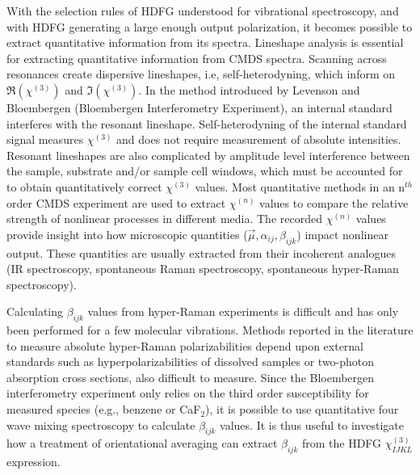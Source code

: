 \documentclass[aip, jcp, reprint, onecolumn]{revtex4-2}
\begin{document}
With the selection rules of HDFG understood for vibrational spectroscopy, and with HDFG generating a large enough output polarization, it becomes possible to extract quantitative information from its spectra.
Lineshape analysis is essential for extracting quantitative information from CMDS spectra.
Scanning across resonances create dispersive lineshapes, i.e, self-heterodyning, which inform on $\Re(\chi^{(3)})$ and $\Im(\chi^{(3)})$.\cite{Levenson1974_1, Levenson1974_2}
In the method introduced by Levenson and Bloembergen (Bloembergen Interferometry Experiment), an internal standard interferes with the resonant lineshape.
Self-heterodyning of the internal standard signal measures $\chi^{(3)}$ and does not require measurement of absolute intensities. 
Resonant lineshapes are also complicated by amplitude level interference between the sample,  substrate and/or sample cell windows, which must be accounted for to obtain quantitatively correct $\chi^{(3)}$ values. \cite{RN362, RN418}
Most quantitative methods in an n$^{th}$ order CMDS experiment are used to extract $\chi^{(n)}$ values to compare the relative strength of nonlinear processes in different media. \cite{Zhu87, RN351, RN345}
The recorded $\chi^{(n)}$ values provide insight into how microscopic quantities ($\vec{\mu}, \alpha_{ij}, \beta_{ijk}$) impact nonlinear output.
These quantities are usually extracted from their incoherent analogues (IR spectroscopy, spontaneous Raman spectroscopy, spontaneous hyper-Raman spectroscopy). \cite{Levenson1974_2, RN412, Shoute2005}

Calculating $\beta_{ijk}$ values from hyper-Raman experiments is difficult and has only been performed for a few molecular vibrations. \cite{Xu1997, Shoute2005, Kelley2010}
Methods reported in the literature to measure absolute hyper-Raman polarizabilities depend upon external standards such as hyperpolarizabilities of dissolved samples or two-photon absorption cross sections, also difficult to measure.
Since the Bloembergen interferometry experiment only relies on the third order susceptibility for measured species (e.g., benzene or CaF$_2$),\cite{Levenson1974_2} it is possible to use quantitative four wave mixing spectroscopy to calculate $\beta_{ijk}$ values.
It is thus useful to investigate how a treatment of orientational averaging can extract $\beta_{ijk}$ from the HDFG $\chi^{(3)}_{IJKL}$ expression.
\end{document}

